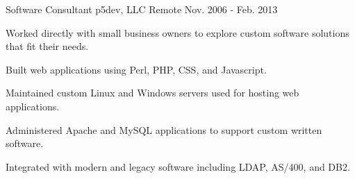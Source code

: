 \begin{cventries}
  \cventry
    {Software Consultant} %
    {p5dev, LLC} %
    {Remote} %
    {Nov. 2006 - Feb. 2013} %
    {
      \begin{cvitems} %
        \item {Worked directly with small business owners to explore custom software solutions that fit their needs.}
        \item {Built web applications using Perl, PHP, CSS, and Javascript.}
        \item {Maintained custom Linux and Windows servers used for hosting web applications.}
        \item {Administered Apache and MySQL applications to support custom written software.}
        \item {Integrated with modern and legacy software including LDAP, AS/400, and DB2.}
      \end{cvitems}
    }

\end{cventries}

